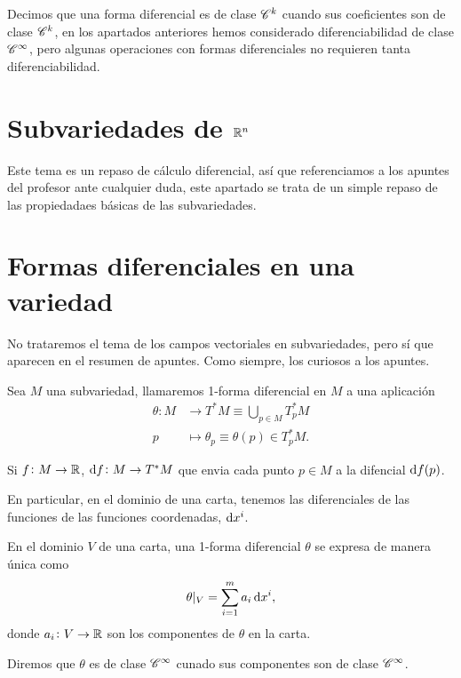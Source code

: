 \begin{defi}
    Decimos que una forma diferencial es de clase $\mathscr{C}^k$ cuando sus coeficientes son de clase $\mathscr{C}^k$, en los apartados anteriores hemos
    considerado diferenciabilidad de clase $\mathscr{C}^\infty$, pero algunas operaciones con formas diferenciales no requieren tanta diferenciabilidad.
\end{defi}

\section{Subvariedades de $\mathbb{R}^n$}

Este tema es un repaso de cálculo diferencial, así que referenciamos a los apuntes del profesor
ante cualquier duda, este apartado se trata de un simple repaso de las propiedadaes b\'asicas de las
subvariedades.

\section{Formas diferenciales en una variedad}

\begin{obs}
    No trataremos el tema de los campos vectoriales en subvariedades, pero sí que aparecen en el resumen de apuntes. Como siempre, los curiosos
    a los apuntes.
\end{obs}

\setcounter{lema}{4}

\begin{defi}
    Sea $M$ una subvariedad, llamaremos 1-forma diferencial en $M$ a una aplicación
    \[
        \begin{aligned}
            \theta \colon M &\to T^\ast M \equiv \bigcup_{p \in M} T^\ast_pM \\
            p &\mapsto \theta_p \equiv \theta(p) \in T^\ast_p M.
        \end{aligned}
    \]
\end{defi}

\begin{obs}
    Si $f \colon M \to \mathbb{R}$, $\dif f \colon M \to T^\ast M$ que envia cada punto $p \in M$ a la difencial $\dif f(p)$.

    En particular, en el dominio de una carta, tenemos las diferenciales de las funciones de las funciones coordenadas, $\dif x^i$.
\end{obs}

\begin{defi}
    En el dominio $V$ de una carta, una 1-forma diferencial $\theta$ se expresa de manera única como
    \[
        \theta \vert_V = \sum^m_{i=1} a_i \dif x^i,
    \]
    donde $a_i \colon V \to \mathbb{R}$ son los componentes de $\theta$ en la carta.

    Diremos que $\theta$ es de clase $\mathscr{C}^\infty$ cunado sus componentes son de clase $\mathscr{C}^\infty$.
\end{defi}

